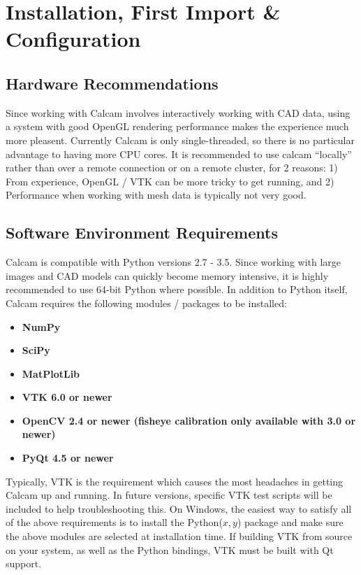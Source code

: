 \documentclass[12pt]{article}
\begin{document}
\section{Installation, First Import \& Configuration}

\subsection{Hardware Recommendations}
Since working with Calcam involves interactively working with CAD data, using a system with good OpenGL rendering performance makes the experience much more pleasent. Currently Calcam is only single-threaded, so there is no particular advantage to having more CPU cores. It is recommended to use calcam ``locally'' rather than over a remote connection or on a remote cluster, for 2 reasons: 1) From experience, OpenGL / VTK can be more tricky to get running, and 2) Performance when working with mesh data is typically not very good.

\subsection{Software Environment Requirements}

Calcam is compatible with Python versions 2.7 - 3.5. Since working with large images and CAD models can quickly become memory intensive, it is highly recommended to use 64-bit Python where possible. In addition to Python itself, Calcam requires the following modules / packages to be installed:

\begin{itemize}
\item \textbf{NumPy}
\item \textbf{SciPy}
\item \textbf{MatPlotLib}
\item \textbf{VTK 6.0 or newer}
\item \textbf{OpenCV 2.4 or newer (fisheye calibration only available with 3.0 or newer)}
\item \textbf{PyQt 4.5 or newer}
\end{itemize}

Typically, VTK is the requirement which causes the most headaches in getting Calcam up and running. In future versions, specific VTK test scripts will be included to help troubleshooting this. On Windows, the easiest way to satisfy all of the above requirements is to install the Python($x,y$) package and make sure the above modules are selected at installation time. If building VTK from source on your system, as well as the Python bindings, VTK must be built with Qt support. 
\end{document}
